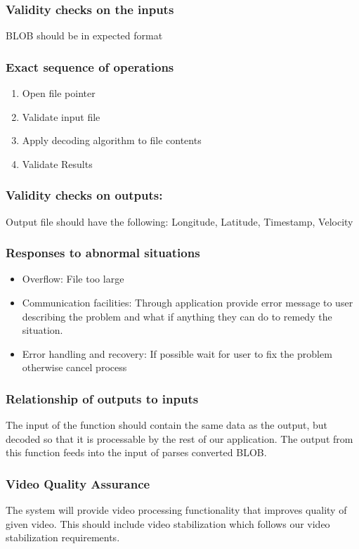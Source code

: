 \documentclass[10pt,letterpaper,onecolumn]{article}
\begin{document}
\subsubsection*{Validity checks on the inputs}
BLOB should be in expected format
\subsubsection*{Exact sequence of operations}
\begin{enumerate}
  \item Open file pointer
  \item Validate input file
  \item Apply decoding algorithm to file contents
  \item Validate Results
\end{enumerate}
\subsubsection*{Validity checks on outputs:}
Output file should have the following: Longitude, Latitude, Timestamp, Velocity
\subsubsection*{Responses to abnormal situations}
\begin{itemize}
  \item Overflow: File too large
  \item Communication facilities: Through application provide error message to user describing the problem and what if anything they can do to remedy the situation.
  \item Error handling and recovery: If possible wait for user to fix the problem otherwise cancel process
\end{itemize}
\subsubsection*{Relationship of outputs to inputs}
The input of the function should contain the same data as the output, but decoded so that it is processable by the rest of our application. The output from this function feeds into the input of parses converted BLOB.
\subsubsection*{Video Quality Assurance}
The system will provide video processing functionality that improves quality of given video. This should include video stabilization which follows our video stabilization requirements.
\end{document}

